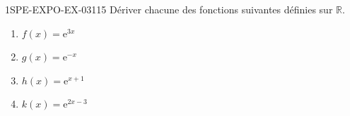 \begin{exercice}{1SPE-EXPO-EX-031}{1}{5}
Dériver chacune des fonctions suivantes définies sur $\mathbb{R}$.
\begin{enumerate}
\item $f(x) = \mathrm{e}^{3x}$
\item $g(x) = \mathrm{e}^{-x}$
\item $h(x) = \mathrm{e}^{x+1}$
\item $k(x) = \mathrm{e}^{2x-3}$
\end{enumerate}
\end{exercice}
